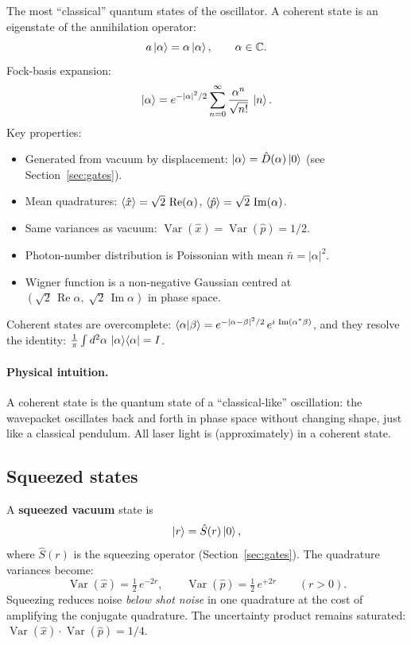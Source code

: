 \documentclass[11pt]{article}
\newcommand{\CC}{\mathbb{C}}
\newcommand{\xh}{\hat{x}}
\newcommand{\ph}{\hat{p}}
\newcommand{\Dop}{\hat{D}}
\newcommand{\Sop}{\hat{S}}
\begin{document}
The most ``classical'' quantum states of the oscillator.
A coherent state is an eigenstate of the annihilation operator:
\begin{equation}
a\ket{\alpha} = \alpha\ket{\alpha}, \qquad \alpha \in \CC.
\end{equation}
Fock-basis expansion:
\begin{equation}\label{eq:coherent-fock}
\ket{\alpha} = e^{-|\alpha|^2/2} \sum_{n=0}^{\infty}
  \frac{\alpha^n}{\sqrt{n!}}\,\ket{n}.
\end{equation}
Key properties:
\begin{itemize}[nosep]
\item Generated from vacuum by displacement:
  $\ket{\alpha} = \Dop(\alpha)\ket{0}$ (see Section~\ref{sec:gates}).
\item Mean quadratures:
  $\expval{\xh} = \sqrt{2}\,\operatorname{Re}(\alpha)$,\;
  $\expval{\ph} = \sqrt{2}\,\operatorname{Im}(\alpha)$.
\item Same variances as vacuum:
  $\operatorname{Var}(\xh) = \operatorname{Var}(\ph) = 1/2$.
\item Photon-number distribution is Poissonian with mean
  $\bar{n} = |\alpha|^2$.
\item Wigner function is a non-negative Gaussian centred at
  $(\sqrt{2}\,\operatorname{Re}\alpha,\; \sqrt{2}\,\operatorname{Im}\alpha)$
  in phase space.
\end{itemize}
Coherent states are overcomplete:
$\braket{\alpha}{\beta} = e^{-|\alpha - \beta|^2/2}\, e^{i\,\operatorname{Im}(\alpha^* \beta)}$,
and they resolve the identity:
$\frac{1}{\pi}\int d^2\alpha\, \ket{\alpha}\!\bra{\alpha} = I$.

\paragraph{Physical intuition.}
A coherent state is the quantum state of a ``classical-like'' oscillation:
the wavepacket oscillates back and forth in phase space without changing
shape, just like a classical pendulum.  All laser light is (approximately)
in a coherent state.

\subsection{Squeezed states}

A \textbf{squeezed vacuum} state is
\begin{equation}
\ket{r} = \Sop(r)\ket{0},
\end{equation}
where $\Sop(r)$ is the squeezing operator (Section~\ref{sec:gates}).
The quadrature variances become:
\begin{equation}\label{eq:squeeze-var}
\operatorname{Var}(\xh) = \tfrac{1}{2}\,e^{-2r}, \qquad
\operatorname{Var}(\ph) = \tfrac{1}{2}\,e^{+2r}
\qquad (r > 0).
\end{equation}
Squeezing reduces noise \emph{below shot noise} in one quadrature at the
cost of amplifying the conjugate quadrature.  The uncertainty product
remains saturated: $\operatorname{Var}(\xh)\cdot\operatorname{Var}(\ph) = 1/4$.
\end{document}

